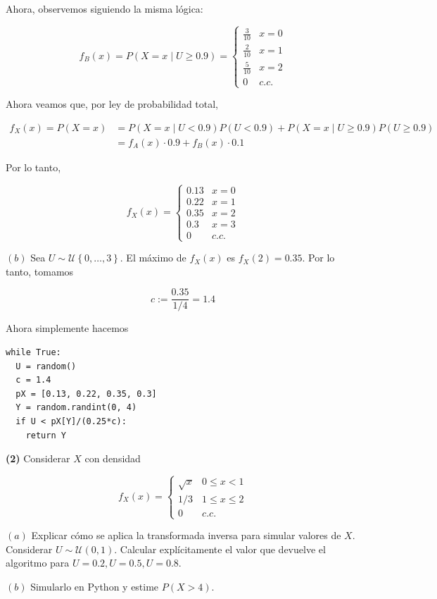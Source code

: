 \documentclass[a4paper, 12pt]{article}
\begin{document}
Ahora, observemos siguiendo la misma lógica: 

\begin{equation*}
  f_B(x) = P(X = x \mid U \geq 0.9) = \begin{cases}
    \frac{3}{10} & x = 0 \\ 
    \frac{2}{10} & x =1 \\ 
    \frac{5}{10} & x=2 \\ 
    0 & c.c.
  \end{cases}
\end{equation*}

Ahora veamos que, por ley de probabilidad total,

\begin{align*}
  f_X(x) = P(X = x) &= P(X = x \mid U < 0.9)P(U < 0.9) + P(X = x \mid U \geq 0.9)P(U \geq
  0.9) \\ 
           &= f_A(x) \cdot 0.9 + f_B(x) \cdot 0.1
\end{align*}

Por lo tanto, 


\begin{equation*}
  f_X(x) = \begin{cases}
    0.13 & x = 0 \\ 
    0.22 & x = 1 \\ 
    0.35 & x = 2 \\ 
    0.3 & x = 3 \\ 
    0 & c.c.
  \end{cases} 
\end{equation*}


$(b)$ Sea $U \sim \mathcal{U}\left\{ 0, \ldots, 3 \right\} $. El máximo de
$f_X(x)$ es $f_X(2) = 0.35$. Por lo tanto, tomamos 

\begin{equation*}
  c := \frac{0.35}{1 / 4} = 1.4
\end{equation*}

Ahora simplemente hacemos 

\begin{verbatim}
while True:
  U = random()
  c = 1.4
  pX = [0.13, 0.22, 0.35, 0.3] 
  Y = random.randint(0, 4)
  if U < pX[Y]/(0.25*c): 
    return Y 
\end{verbatim}

\pagebreak 

\begin{myframe}
  \textbf{(2)} Considerar $X$ con densidad 

  \begin{equation*}
    f_X(x) = \begin{cases}
      \sqrt{x}  & 0 \leq x < 1 \\ 
      1 / 3 & 1 \leq x \leq 2 \\ 
      0 & c.c.
    \end{cases}
  \end{equation*}

  $(a)$ Explicar cómo se aplica la transformada inversa para simular valores de $X$.
  Considerar $U \sim \mathcal{U}(0, 1)$. Calcular explícitamente el valor que
  devuelve el algoritmo para $U = 0.2, U = 0.5, U = 0.8$. 

  $(b)$ Simularlo en Python y estime $P(X > 4)$.
\end{myframe}
\end{document}

